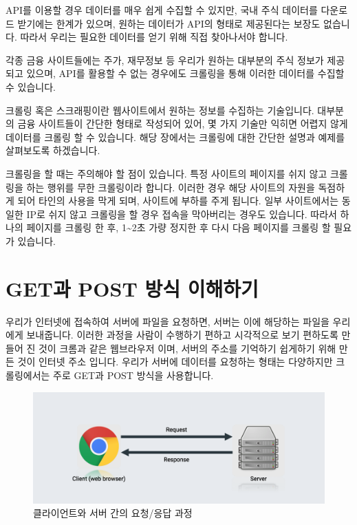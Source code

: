 \documentclass[12pt,]{book}
\begin{document}
API를 이용할 경우 데이터를 매우 쉽게 수집할 수 있지만, 국내 주식 데이터를 다운로드 받기에는 한계가 있으며, 원하는 데이터가 API의 형태로 제공된다는 보장도 없습니다. 따라서 우리는 필요한 데이터를 얻기 위해 직접 찾아나서야 합니다.

각종 금융 사이트들에는 주가, 재무정보 등 우리가 원하는 대부분의 주식 정보가 제공되고 있으며, API를 활용할 수 없는 경우에도 크롤링을 통해 이러한 데이터를 수집할 수 있습니다.

크롤링 혹은 스크래핑이란 웹사이트에서 원하는 정보를 수집하는 기술입니다. 대부분의 금융 사이트들이 간단한 형태로 작성되어 있어, 몇 가지 기술만 익히면 어렵지 않게 데이터를 크롤링 할 수 있습니다. 해당 장에서는 크롤링에 대한 간단한 설명과 예제를 살펴보도록 하겠습니다.

크롤링을 할 때는 주의해야 할 점이 있습니다. 특정 사이트의 페이지를 쉬지 않고 크롤링을 하는 행위를 무한 크롤링이라 합니다. 이러한 경우 해당 사이트의 자원을 독점하게 되어 타인의 사용을 막게 되며, 사이트에 부하를 주게 됩니다. 일부 사이트에서는 동일한 IP로 쉬지 않고 크롤링을 할 경우 접속을 막아버리는 경우도 있습니다. 따라서 하나의 페이지를 크롤링 한 후, 1\textasciitilde{}2초 가량 정지한 후 다시 다음 페이지를 크롤링 할 필요가 있습니다.

\hypertarget{get-post--}{%
\section{GET과 POST 방식 이해하기}\label{get-post--}}

우리가 인터넷에 접속하여 서버에 파일을 요청하면, 서버는 이에 해당하는 파일을 우리에게 보내줍니다. 이러한 과정을 사람이 수행하기 편하고 시각적으로 보기 편하도록 만들어 진 것이 크롬과 같은 웹브라우저 이며, 서버의 주소를 기억하기 쉽게하기 위해 만든 것이 인터넷 주소 입니다. 우리가 서버에 데이터를 요청하는 형태는 다양하지만 크롤링에서는 주로 GET과 POST 방식을 사용합니다.

\begin{figure}[h]

{\centering \includegraphics[width=0.7\linewidth]{images/crawl_flow} 

}

\caption{클라이언트와 서버 간의 요청/응답 과정}\label{fig:unnamed-chunk-2}
\end{figure}
\end{document}
